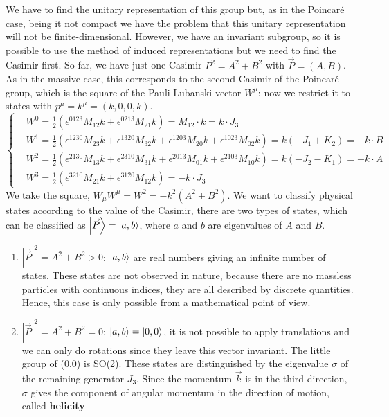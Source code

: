 \documentclass[../main.tex]{subfiles}
\begin{document}
We have to find the unitary representation of this group but, as in the Poincaré case, being it not compact we have the problem that this unitary representation will not be finite-dimensional. However, we have an invariant subgroup, so it is possible to use the method of induced representations but we need to find the Casimir first. So far, we have just one Casimir $P^2=A^2+B^2$ with $\vec{P}=(A,B)$. As in the massive case, this corresponds to the second Casimir of the Poincaré group, which is the square of the Pauli-Lubanski vector $W^\mu$: now we restrict it to states with $p^\mu=k^\mu=(k,0,0,k)$.
\[
\left\{
\begin{aligned}
&W^0=\frac{1}{2}(\epsilon^{0123}M_{12}k+\epsilon^{0213}M_{21}k)=M_{12}\cdot k=k\cdot J_3\\
&W^1=\frac{1}{2}(\epsilon^{1230}M_{23}k+\epsilon^{1320}M_{32}k+\epsilon^{1203}M_{20}k+\epsilon^{1023}M_{02}k)=k(-J_1+K_2)=+k\cdot B\\
&W^2=\frac{1}{2}(\epsilon^{2130}M_{13}k+\epsilon^{2310}M_{31}k+\epsilon^{2013}M_{01}k+\epsilon^{2103}M_{10}k)=k(-J_2-K_1)=-k\cdot A\\
&W^3=\frac{1}{2}(\epsilon^{3210}M_{21}k+\epsilon^{3120}M_{12}k)=-k\cdot J_3
\end{aligned}
\right.
\]
We take the square, $W_\mu W^\mu=W^2=-k^2(A^2+B^2)$. We want to classify physical states according to the value of the Casimir, there are two types of states, which can be classified as $\ket{\Vec{P}}=\ket{a,b}$, where $a$ and $b$ are eigenvalues of $A$ and $B$.
\begin{enumerate}
    \item $|\vec{P}|^2=A^2+B^2>0$: $\ket{a,b}$ are real numbers giving an infinite number of states. These states are not observed in nature, because there are no massless particles with continuous indices, they are all described by discrete quantities. Hence, this case is only possible from a mathematical point of view.
    \item $|\vec{P}|^2=A^2+B^2=0$: $\ket{a,b}=\ket{0,0}$, it is not possible to apply translations and we can only do rotations since they leave this vector invariant. The little group of (0,0) is SO(2). These states are distinguished by the eigenvalue $\sigma$ of the remaining generator $J_3$. Since the momentum $\Vec{k}$ is in the third direction, $\sigma$ gives the component of angular momentum in the direction of motion, called \textbf{helicity}
\end{enumerate}
\end{document}
